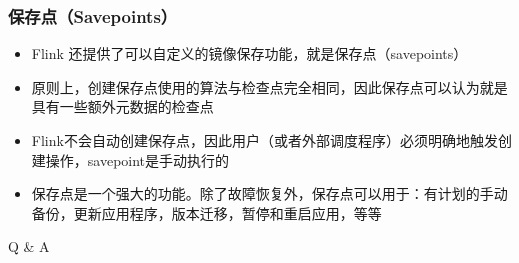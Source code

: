 \documentclass{beamer}
\begin{document}
  \begin{frame}
      \frametitle{保存点（Savepoints）}
  
      \begin{itemize}
          \item Flink 还提供了可以自定义的镜像保存功能，就是保存点（savepoints）
          \item 原则上，创建保存点使用的算法与检查点完全相同，因此保存点可以认为就是具有一些额外元数据的检查点
          \item Flink不会自动创建保存点，因此用户（或者外部调度程序）必须明确地触发创建操作，savepoint是手动执行的
          \item 保存点是一个强大的功能。除了故障恢复外，保存点可以用于：有计划的手动备份，更新应用程序，版本迁移，暂停和重启应用，等等
      \end{itemize}
  
  \end{frame}

  \begin{frame}[plain,c]
    
    \begin{center}
    \Huge Q \& A
    \end{center}
    
  \end{frame}
\end{document}

